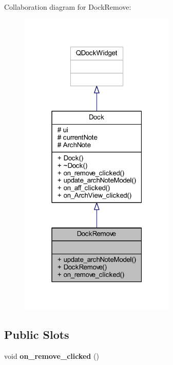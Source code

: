 Collaboration diagram for Dock\+Remove\+:\nopagebreak
\begin{figure}[H]
\begin{center}
\leavevmode
\includegraphics[width=211pt]{class_dock_remove__coll__graph}
\end{center}
\end{figure}
\subsection*{Public Slots}
\begin{DoxyCompactItemize}
\item 
\mbox{\label{class_dock_remove_af674d9505592df25cd5b08328c0cdbd6}} 
void {\bfseries on\+\_\+remove\+\_\+clicked} ()
\end{DoxyCompactItemize}
